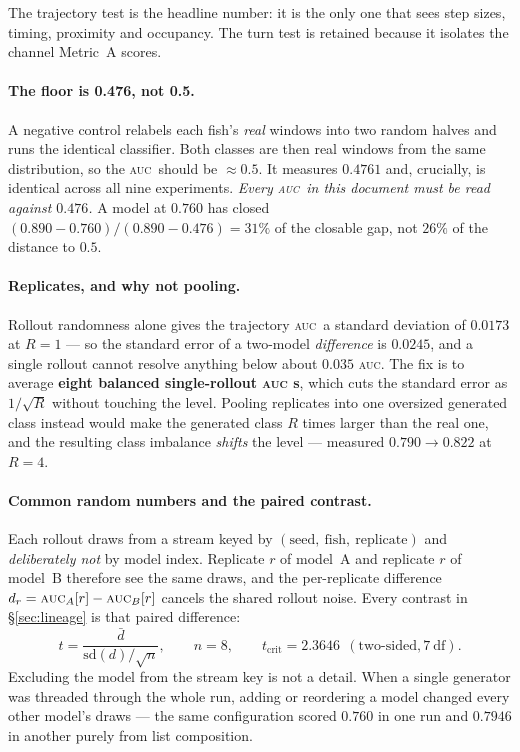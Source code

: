 \documentclass[11pt,a4paper]{article}
\newcommand{\auc}{\textsc{auc}}
\begin{document}
The trajectory test is the headline number: it is the only one that sees step sizes,
timing, proximity and occupancy. The turn test is retained because it isolates the
channel Metric~A scores.

\paragraph{The floor is 0.476, not 0.5.}
A negative control relabels each fish's \emph{real} windows into two random halves and
runs the identical classifier. Both classes are then real windows from the same
distribution, so the \auc\ should be $\approx 0.5$. It measures
$\mathbf{0.4761}$ and, crucially, is identical across all nine experiments. \emph{Every
\auc\ in this document must be read against $0.476$.} A model at $0.760$ has closed
$(0.890-0.760)/(0.890-0.476) = 31\%$ of the closable gap, not $26\%$ of the distance to
$0.5$.

\paragraph{Replicates, and why not pooling.}
Rollout randomness alone gives the trajectory \auc\ a standard deviation of $0.0173$ at
$R=1$ --- so the standard error of a two-model \emph{difference} is $0.0245$, and a
single rollout cannot resolve anything below about $0.035$ \auc. The fix is to average
\textbf{eight balanced single-rollout \auc{} s}, which cuts the standard error as
$1/\sqrt{R}$ without touching the level. Pooling replicates into one oversized generated
class instead would make the generated class $R$ times larger than the real one, and the
resulting class imbalance \emph{shifts} the level --- measured $0.790 \to 0.822$ at
$R=4$.

\paragraph{Common random numbers and the paired contrast.}
Each rollout draws from a stream keyed by $(\text{seed},\ \text{fish},\ \text{replicate})$
and \emph{deliberately not} by model index. Replicate $r$ of model~A and replicate $r$ of
model~B therefore see the same draws, and the per-replicate difference
$d_r = \auc_A[r] - \auc_B[r]$ cancels the shared rollout noise. Every contrast in
\S\ref{sec:lineage} is that paired difference:
\begin{equation}
t = \frac{\bar d}{\mathrm{sd}(d)/\sqrt{n}}, \qquad n = 8,\qquad
t_{\mathrm{crit}} = 2.3646 \ \ (\text{two-sided}, 7\ \mathrm{df}).
\end{equation}
Excluding the model from the stream key is not a detail. When a single generator was
threaded through the whole run, adding or reordering a model changed every other model's
draws --- the same configuration scored $0.760$ in one run and $0.7946$ in another purely
from list composition.
\end{document}
